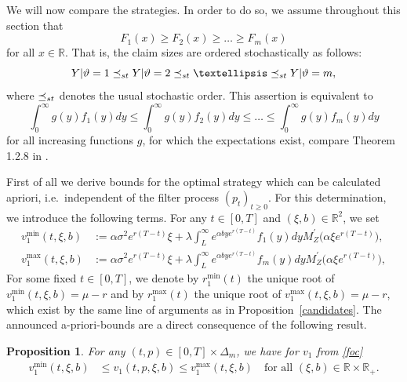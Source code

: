 \documentclass[reqno, 11pt]{amsart}%
\newcommand{\R}{\mathbb{R}}
\newtheorem{proposition}[theorem]{Proposition}
\theoremstyle{definition}
\numberwithin{equation}{section} \numberwithin{theorem}{section}
\begin{document}
We will now compare the strategies. In order to do so, we assume throughout this section that
\begin{equation*}
F_1(x)\ge F_2(x)\ge \ldots \ge F_m(x)
\end{equation*}
for all $x\in\R$. That is, the claim sizes are ordered stochastically as follows:
\begin{equation*}
Y|\vartheta=1 \preceq_{\textup{st}} Y|\vartheta=2 \preceq_{\textup{st}}\ldots\preceq_{\textup{st}} Y|\vartheta=m,
\end{equation*}
where $\preceq_{\textup{st}}$ denotes the usual stochastic order. This assertion is equivalent to
\begin{equation*}
\int_0^\infty g(y) f_1(y)dy\le\int_0^\infty g(y) f_2(y)dy\le \ldots \le \int_0^\infty g(y) f_m(y)dy
\end{equation*}
for all increasing functions $g$, for which the expectations exist, compare Theorem 1.2.8 in \cite{MuellerStoyan2002}.

First of all we derive bounds for the optimal strategy which can be calculated apriori, i.e.\ independent of the filter process $(p_t)_{t\ge0}$.
For this determination, we introduce the following terms. For any $t\in[0,T]$ and $(\xi,b)\in\R^2$, we set
\begin{align*}
v_1^{\min}(t,\xi,b) &:= \alpha\sigma^2e^{r(T-t)}\xi + \lambda \int_L^\infty e^{\alpha b y e^{r(T-t)}}f_1(y)dy M_Z^\prime\big(\alpha \xi e^{r(T-t)}\big),\\
v_1^{\max}(t,\xi,b) &:= \alpha\sigma^2e^{r(T-t)}\xi + \lambda \int_L^\infty e^{\alpha b y e^{r(T-t)}}f_m(y)dy M_Z^\prime\big(\alpha \xi e^{r(T-t)}\big),
\end{align*}
For some fixed $t\in[0,T]$, we denote by $r^{\min}_1(t)$ the unique root of $v_1^{\min}(t,\xi,b) = \mu-r$ and by $r^{\max}_1(t)$ the unique root of $v_1^{\max}(t,\xi,b) = \mu-r$,  which exist by the same line of arguments as in Proposition~\ref{candidates}.
The announced a-priori-bounds are a direct consequence of the following result.

\begin{proposition}\label{pr:aprioribounds}
   For any $(t,p)\in[0,T]\times\Delta_m$, we have for $v_1$ from \eqref{foc}
   \begin{align*}
   v_1^{\min}(t,\xi,b) &\le v_1(t,p,\xi,b) \le v_1^{\max}(t,\xi,b)\quad\text{for all }(\xi,b)\in\R\times\R_+.
   \end{align*}
\end{proposition}
\end{document}
